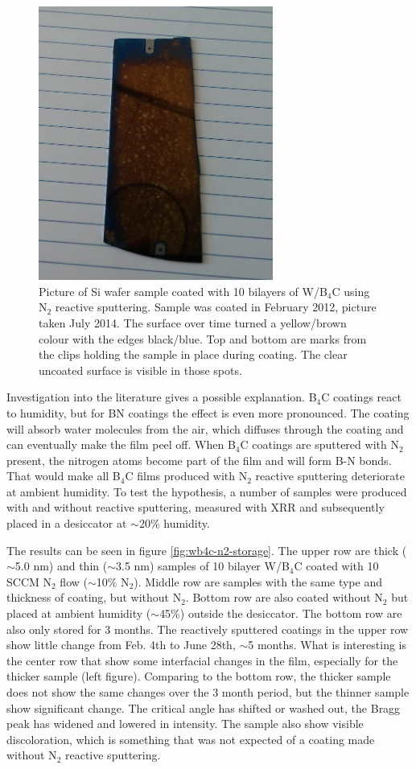 \begin{figure}[!h]
	\center	\includegraphics[height=9cm]{figures/athena/coatings/si5556.jpg}
\caption{\footnotesize Picture of Si wafer sample coated with 10 bilayers of W/B$_4$C using N$_2$ reactive sputtering. Sample was coated in February 2012, picture taken July 2014. The surface over time turned a yellow/brown colour with the edges black/blue. Top and bottom are marks from the clips holding the sample in place during coating. The clear uncoated surface is visible in those spots.}\label{fig:discolor}
\end{figure}

Investigation into the literature gives a possible explanation. B$_4$C coatings react to humidity, but for BN coatings the effect is even more pronounced. The coating will absorb water molecules from the air, which diffuses through the coating and can eventually make the film peel off\cite{Cardinale:1994ha}. When B$_4$C coatings are sputtered with N$_2$ present, the nitrogen atoms become part of the film and will form B-N bonds. That would make all B$_4$C films produced with N$_2$ reactive sputtering deteriorate at ambient humidity. To test the hypothesis, a number of samples were produced with and without reactive sputtering, measured with XRR and subsequently placed in a desiccator at $\sim$20\% humidity.

The results can be seen in figure \ref{fig:wb4c-n2-storage}. The upper row are thick ($\sim$5.0 nm) and thin ($\sim$3.5 nm) samples of 10 bilayer W/B$_4$C coated with 10 SCCM N$_2$ flow ($\sim$10\% N$_2$). Middle row are samples with the same type and thickness of coating, but without N$_2$. Bottom row are also coated without N$_2$ but placed at ambient humidity ($\sim$45\%) outside the desiccator. The bottom row are also only stored for 3 months. The reactively sputtered coatings in the upper row show little change from Feb. 4th to June 28th, $\sim$5 months. What is interesting is the center row that show some interfacial changes in the film, especially for the thicker sample (left figure). Comparing to the bottom row, the thicker sample does not show the same changes over the 3 month period, but the thinner sample show significant change. The critical angle has shifted or washed out, the Bragg peak has widened and lowered in intensity. The sample also show visible discoloration, which is something that was not expected of a coating made without N$_2$ reactive sputtering.

